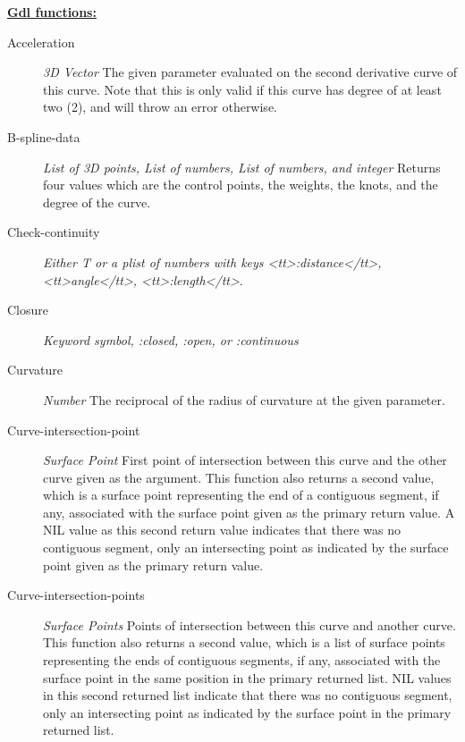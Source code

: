 \documentclass [11pt]{book}
\begin{document}
\begin{itemize}
\textbf{
\underline{Gdl functions:}}

\begin{description}

\item [Acceleration]
\emph{3D Vector} The given parameter evaluated on the second derivative curve of this curve. Note that this is
only valid if this curve has degree of at least two (2), and will throw an error otherwise.


\item [B-spline-data]
\emph{List of 3D points, List of numbers, List of numbers, and integer} Returns four values which are
the control points, the weights, the knots, and the degree of the curve.


\item [Check-continuity]
\emph{Either T or a plist of numbers with keys <tt>:distance</tt>, <tt>angle</tt>, <tt>:length</tt>}.


\item [Closure]
\emph{Keyword symbol, :closed, :open, or :continuous}

\item [Curvature]
\emph{Number} The reciprocal of the radius of curvature at the given parameter.


\item [Curve-intersection-point]
\emph{Surface Point}  First point of intersection between this curve and the other curve given as the argument.
This function also returns a second value, which is a surface point representing the end of
a contiguous segment, if any, associated with the surface point given as the primary return value.
A NIL value as this second return value indicates that there was no contiguous segment, only an
intersecting point as indicated by the surface point given as the primary return value.


\item [Curve-intersection-points]
\emph{Surface Points}  Points of intersection between this curve and another curve.
This function also returns a second value, which is a list of surface points representing the ends of
contiguous segments, if any, associated with the surface point in the same position in the primary returned list.
NIL values in this second returned list indicate that there was no contiguous segment, only an intersecting point
as indicated by the surface point in the primary returned list.



\end{description}
\end{itemize}
\end{document}
